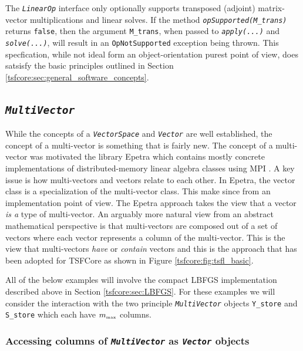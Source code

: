 \documentclass[10pt,fleqn]{article}
\begin{document}
The \texttt{\textit{LinearOp}} interface only optionally supports
transposed (adjoint) matrix-vector multiplications and linear solves.
If the method \texttt{\textit{opSupported(M\_trans)}} returns
\texttt{false}, then the argument \texttt{M\_trans}, when
passed to \texttt{\textit{apply(...)}} and
\texttt{\textit{solve(...)}}, will result in an
\texttt{OpNotSupported} exception being thrown.
This specfication, while not ideal form an object-orientation purest
point of view, does satsisfy the basic principles outlined in Section
\ref{tsfcore:sec:general_software_concepts}.

%
\subsection{\texttt{\textit{MultiVector}}}
\label{tsfcore:sec:multi_vec}
%

While the concepts of a \texttt{\textit{VectorSpace}} and
\texttt{\textit{Vector}} are well established, the
concept of a multi-vector is something that is fairly new.  The
concept of a multi-vector was motivated the library Epetra
\cite{ref:Epetra} which contains mostly concrete implementations of
distributed-memory linear algebra classes using MPI \cite{ref:mpi}.  A
key issue is how multi-vectors and vectors relate to each other.  In
Epetra, the vector class is a specialization of the multi-vector
class.  This make since from an implementation point of view.  The
Epetra approach takes the view that a vector {\em is a} type of
multi-vector.  An arguably more natural view from an abstract
mathematical perspective is that multi-vectors are composed out of a
set of vectors where each vector represents a column of the
multi-vector.  This is the view that multi-vectors {\em have} or {\em
contain} vectors and this is the approach that has been adopted for
TSFCore as shown in Figure \ref{tsfcore:fig:tsfl_basic}.

All of the below examples will involve the compact LBFGS
implementation described above in Section \ref{tsfcore:sec:LBFGS}.  For
these examples we will consider the interaction with the two principle
\texttt{\textit{MultiVector}} objects \texttt{Y\_store} and
\texttt{S\_store} which each have $m_{\tiny\mbox{max}}$ columns.

%
\subsubsection{Accessing columns of \texttt{\textit{MultiVector}} as \texttt{\textit{Vector}} objects}
%
\end{document}
